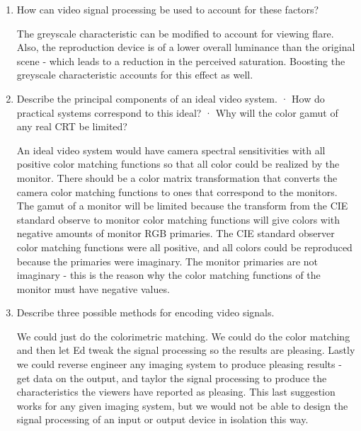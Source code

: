 \begin{enumerate}
\item  How can video signal processing be used to account for
these factors?
\newline
\par The greyscale characteristic can be modified to account for
viewing flare.  Also, the reproduction device is of a lower
overall luminance than the original scene - which leads to a
reduction in the perceived saturation.  Boosting the greyscale
characteristic accounts for this effect as well.
\newline

\item Describe the principal components of an ideal video system.
 · How do practical systems correspond to this ideal?
 · Why will the color gamut of any real CRT be limited?
\newline
\par An ideal video system would have camera spectral
sensitivities with all positive color matching functions so that
all color could be realized by the monitor.  There should be a
color matrix transformation that converts the camera color
matching functions to ones that correspond to the monitors.  The
gamut of a monitor will be limited because the transform from the
CIE standard observe to monitor color matching functions will give
colors with negative amounts of monitor RGB primaries.  The CIE
standard observer color matching functions were all positive, and
all colors could be reproduced because the primaries were
imaginary.  The monitor primaries are not imaginary - this is the
reason why the color matching functions of the monitor must have
negative values.
\newline

\item Describe three possible methods for encoding video signals.
\newline
\par We could just do the colorimetric matching.  We could do the
color matching and then let Ed tweak the signal processing so the
results are pleasing.  Lastly we could reverse engineer any
imaging system to produce pleasing results - get data on the
output, and taylor the signal processing to produce the
characteristics the viewers have reported as pleasing.  This last
suggestion works for any given imaging system, but we would not be
able to design the signal processing of an input or output device
in isolation this way.


\end{enumerate}
